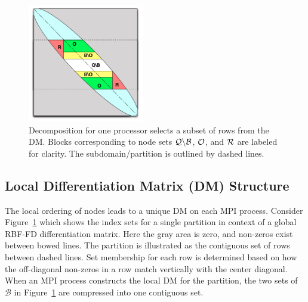 \documentclass{report}
\begin{document}
\begin{figure}
\begin{center}
\includegraphics[width=0.45\textwidth]{rbffd_methods_content/decompositions/MatrixDecompositionSets_RBF-FD_Bowed.pdf} 
\caption{Decomposition for one processor selects a subset of rows from the DM. Blocks corresponding to node sets $\mathcal{Q} \backslash \mathcal{B}$, $\mathcal{O}$, and $\mathcal{R}$ are labeled for clarity. The subdomain/partition is outlined by dashed lines.}
\label{fig:decomp_matrix_view}
\end{center}
\end{figure}

\subsection{Local Differentiation Matrix (DM) Structure}

The local ordering of nodes leads to a unique DM on each MPI process. Consider Figure~\ref{fig:decomp_matrix_view} which shows the index sets for a single partition in context of a global RBF-FD differentiation matrix. Here the gray area is zero, and non-zeros exist between bowed lines. The partition is illustrated as the contiguous set of rows between dashed lines. Set membership for each row is determined based on how the off-diagonal non-zeros in a row match vertically with the center diagonal. When an MPI process constructs the local DM for the partition, the two sets of $\mathcal{B}$ in Figure~\ref{fig:decomp_matrix_view} are compressed into one contiguous set. %
\end{document}
